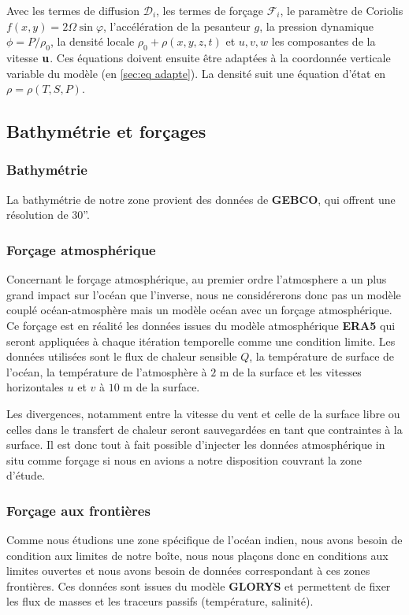 Avec les termes de diffusion $\mathcal{D}_i$, les termes de forçage $\mathcal{F}_i$, le paramètre de Coriolis $f(x,y) = 2 \Omega \sin{\varphi}$, l'accélération de la pesanteur $g$, la pression dynamique $\phi = P/ \rho_0$, la densité locale $\rho_0 + \rho(x,y,z,t)$ et $u,v,w$ les composantes de la vitesse $\mathbf{u}$. Ces équations doivent ensuite être adaptées à la coordonnée verticale variable du modèle (en \autoref{sec:eq adapte}). La densité suit une équation d'état en $\rho = \rho(T,S,P)$.

\subsection{Bathymétrie et forçages}
\subsubsection{Bathymétrie}
La bathymétrie de notre zone provient des données de \textbf{GEBCO}, qui offrent une résolution de 30''.

\subsubsection{Forçage atmosphérique}
Concernant le forçage atmosphérique, au premier ordre l'atmosphere a un plus grand impact sur l'océan que l'inverse, nous ne considérerons donc pas un modèle couplé océan-atmosphère mais un modèle océan avec un forçage atmosphérique. Ce forçage est en réalité les données issues du modèle atmosphérique \textbf{ERA5} \cite{hersbach_era5_2020} qui seront appliquées à chaque itération temporelle comme une condition limite. Les données utilisées sont le flux de chaleur sensible $Q$, la température de surface de l'océan, la température de l'atmosphère à $2$ m de la surface et les vitesses horizontales $u$ et $v$ à $10$ m de la surface. 

Les divergences, notamment entre la vitesse du vent et celle de la surface libre ou celles dans le transfert de chaleur seront sauvegardées en tant que contraintes à la surface. Il est donc tout à fait possible d'injecter les données atmosphérique in situ comme forçage si nous en avions a notre disposition couvrant la zone d'étude.
\subsubsection{Forçage aux frontières}
Comme nous étudions une zone spécifique de l'océan indien, nous avons besoin de condition aux limites de notre boîte, nous nous plaçons donc en conditions aux limites ouvertes et nous avons besoin de données correspondant à ces zones frontières. Ces données sont issues du modèle \textbf{GLORYS} et permettent de fixer les flux de masses et les traceurs passifs (température, salinité).

